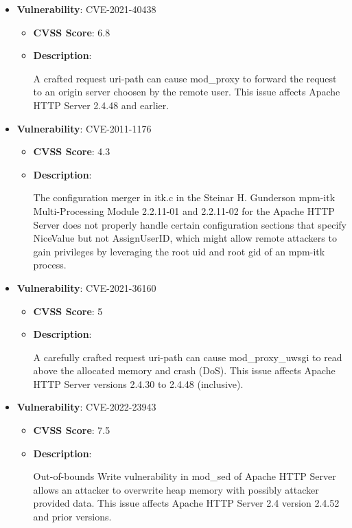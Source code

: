 \documentclass{article}
\begin{document}
\begin{itemize}
        \item \textbf{Vulnerability}: CVE-2021-40438
        \begin{itemize}
            \item \textbf{CVSS Score}:  6.8 
            \item \textbf{Description}:
            \parbox[t]{0.9\linewidth}{
                \ttfamily A crafted request uri-path can cause mod\_proxy to forward the request to an origin server choosen by the remote user. This issue affects Apache HTTP Server 2.4.48 and earlier.
            }
        \end{itemize}
    
        \item \textbf{Vulnerability}: CVE-2011-1176
        \begin{itemize}
            \item \textbf{CVSS Score}:  4.3 
            \item \textbf{Description}:
            \parbox[t]{0.9\linewidth}{
                \ttfamily The configuration merger in itk.c in the Steinar H. Gunderson mpm-itk Multi-Processing Module 2.2.11-01 and 2.2.11-02 for the Apache HTTP Server does not properly handle certain configuration sections that specify NiceValue but not AssignUserID, which might allow remote attackers to gain privileges by leveraging the root uid and root gid of an mpm-itk process.
            }
        \end{itemize}
    
        \item \textbf{Vulnerability}: CVE-2021-36160
        \begin{itemize}
            \item \textbf{CVSS Score}:  5 
            \item \textbf{Description}:
            \parbox[t]{0.9\linewidth}{
                \ttfamily A carefully crafted request uri-path can cause mod\_proxy\_uwsgi to read above the allocated memory and crash (DoS). This issue affects Apache HTTP Server versions 2.4.30 to 2.4.48 (inclusive).
            }
        \end{itemize}
    
        \item \textbf{Vulnerability}: CVE-2022-23943
        \begin{itemize}
            \item \textbf{CVSS Score}:  7.5 
            \item \textbf{Description}:
            \parbox[t]{0.9\linewidth}{
                \ttfamily Out-of-bounds Write vulnerability in mod\_sed of Apache HTTP Server allows an attacker to overwrite heap memory with possibly attacker provided data. This issue affects Apache HTTP Server 2.4 version 2.4.52 and prior versions.
            }
        \end{itemize}
    

\end{itemize}
\end{document}
